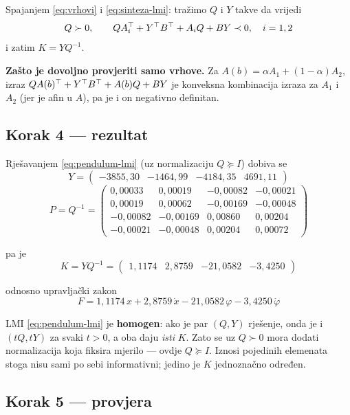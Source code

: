 \begin{zadatak}
Spajanjem \eqref{eq:vrhovi} i \eqref{eq:sinteza-lmi}: tražimo $Q$ i $Y$ takve
da vrijedi
\begin{equation}
\label{eq:pendulum-lmi}
Q \succ 0, \qquad
QA_i^{\top} + Y^{\top} B^{\top} + A_iQ + BY \prec 0, \quad i = 1,2
\end{equation}
i zatim $K = YQ^{-1}$.

\textbf{Zašto je dovoljno provjeriti samo vrhove.} Za $A(b) = \alpha A_1 +
(1-\alpha)A_2$, izraz $QA(b)^{\top} + Y^{\top} B^{\top} + A(b)Q + BY$ je konveksna
kombinacija izraza za $A_1$ i $A_2$ (jer je afin u $A$), pa je i on negativno
definitan. \checkmark

\subsection*{Korak 4 --- rezultat}

Rješavanjem \eqref{eq:pendulum-lmi} (uz normalizaciju $Q \succeq I$) dobiva se
\[
Y = \begin{pmatrix}-3855{,}30 & -1464{,}99 & -4184{,}35 & 4691{,}11\end{pmatrix}
\]
\[
P = Q^{-1} = \begin{pmatrix}
0{,}00033 & 0{,}00019 & -0{,}00082 & -0{,}00021 \\
0{,}00019 & 0{,}00062 & -0{,}00169 & -0{,}00048 \\
-0{,}00082 & -0{,}00169 & 0{,}00860 & 0{,}00204 \\
-0{,}00021 & -0{,}00048 & 0{,}00204 & 0{,}00072
\end{pmatrix}
\]

pa je
\[
\boxed{\;
K = YQ^{-1} = \begin{pmatrix}
1{,}1174 & 2{,}8759 & -21{,}0582 & -3{,}4250
\end{pmatrix}
\;}
\]

odnosno upravljački zakon
\[
F = 1{,}1174\,x + 2{,}8759\,\dot x - 21{,}0582\,\varphi - 3{,}4250\,\dot\varphi
\]

\begin{napomena}
LMI \eqref{eq:pendulum-lmi} je \textbf{homogen}: ako je par $(Q,Y)$ rješenje,
onda je i $(tQ, tY)$ za svaki $t > 0$, a oba daju \emph{isti} $K$. Zato se uz
$Q \succ 0$ mora dodati normalizacija koja fiksira mjerilo --- ovdje
$Q \succeq I$. Iznosi pojedinih elemenata stoga nisu sami po sebi informativni;
jedino je $K$ jednoznačno određen.
\end{napomena}

\subsection*{Korak 5 --- provjera}


\end{zadatak}

